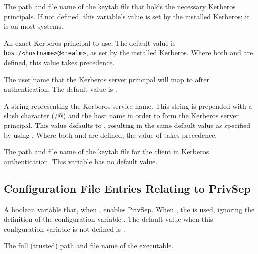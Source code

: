 \begin{description}
\label{param:KerberosServerKeytab}
\item[\Macro{KERBEROS\_SERVER\_KEYTAB}]
  The path and file name of the keytab file that holds the necessary Kerberos
  principals.
  If not defined, this variable's value is set by the installed Kerberos;
  it is  on most systems.

\label{param:KerberosServerPrincipal}
\item[\Macro{KERBEROS\_SERVER\_PRINCIPAL}]
  An exact Kerberos principal to use.
  The default value is \verb$host/<hostname>@<realm>$, as set by the
  installed Kerberos.
  Where both  and
   are defined, this value takes
  precedence.

\label{param:KerberosServerUser}
\item[\Macro{KERBEROS\_SERVER\_USER}]
  The user name that the Kerberos server principal will map to after
  authentication.
  The default value is \verb@condor@.

\label{param:KerberosServerService}
\item[\Macro{KERBEROS\_SERVER\_SERVICE}]
  A string representing the Kerberos service name.
  This string is prepended with a slash character (\verb@/@) and the host name
  in order to form the Kerberos server principal.
  This value defaults to \verb@host@, resulting in the same default value
  as specified by using .
  Where both  and
   are defined, the value of
   takes precedence.


\label{param:KerberosClientKeytab}
\item[\Macro{KERBEROS\_CLIENT\_KEYTAB}]
  The path and file name of the keytab file for the client
  in Kerberos authentication.
  This variable has no default value.

\end{description}

\subsection{\label{sec:Config-PrivSep}Configuration File Entries
Relating to PrivSep}
\begin{description}
\label{param:PrivSepEnabled}
\item[\Macro{PRIVSEP\_ENABLED}]
  A boolean variable that, when , enables PrivSep.
  When , the  is used,
  ignoring the definition of the configuration variable .
  The default value when this configuration variable is not defined
  is .

\label{param:PrivSepSwitchboard}
\item[\Macro{PRIVSEP\_SWITCHBOARD}]
  The full (trusted) path and file name of the 
  executable.

\end{description}

